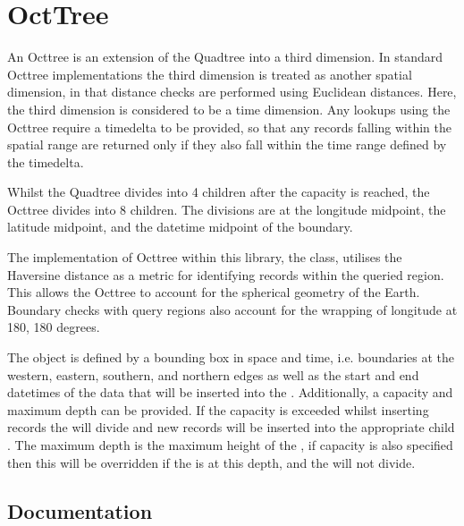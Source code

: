 \documentclass[letterpaper,10pt,english]{sphinxmanual}
\begin{document}
\sphinxstepscope


\chapter{OctTree}
\label{\detokenize{octtree:octtree}}\label{\detokenize{octtree::doc}}
\sphinxAtStartPar
An Octtree is an extension of the Quadtree into a third dimension. In standard Octtree implementations the third
dimension is treated as another spatial dimension, in that distance checks are performed using Euclidean distances.
Here, the third dimension is considered to be a time dimension. Any look\sphinxhyphen{}ups using the Octtree require a timedelta to be
provided, so that any records falling within the spatial range are returned only if they also fall within the time range
defined by the timedelta.

\sphinxAtStartPar
Whilst the Quadtree divides into 4 children after the capacity is reached, the Octtree divides into 8 children. The
divisions are at the longitude midpoint, the latitude midpoint, and the datetime midpoint of the boundary.

\sphinxAtStartPar
The implementation of Octtree within this library, the  class, utilises the Haversine distance as a metric
for identifying records within the queried region. This allows the Octtree to account for the spherical geometry of the
Earth. Boundary checks with query regions also account for the wrapping of longitude at \sphinxhyphen{}180, 180 degrees.

\sphinxAtStartPar
The  object is defined by a bounding box in space and time, i.e. boundaries at the western, eastern,
southern, and northern edges as well as the start and end datetimes of the data that will be inserted into the .
Additionally, a capacity and maximum depth can be provided. If the capacity is exceeded whilst inserting records the
 will divide and new records will be inserted into the appropriate child . The maximum depth is the
maximum height of the , if capacity is also specified then this will be overridden if the  is at this
depth, and the  will not divide.


\section{Documentation}
\label{\detokenize{octtree:documentation}}
\end{document}
